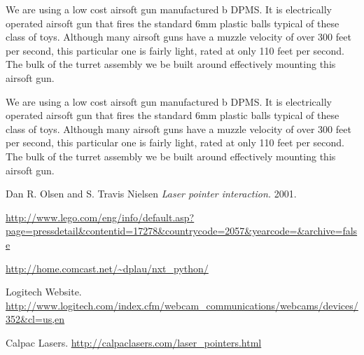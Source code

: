 \documentclass[10pt,twocolumn,letterpaper]{article}
\begin{document}
We are using a low cost airsoft gun manufactured b DPMS. It is electrically operated airsoft gun that fires the standard 6mm plastic balls typical of these class of toys. Although many airsoft guns have a muzzle velocity of over 300 feet per second, this particular one is fairly light, rated at only 110 feet per second. The bulk of the turret assembly we be built around effectively mounting this airsoft gun.

We are using a low cost airsoft gun manufactured b DPMS. It is electrically operated airsoft gun that fires the standard 6mm plastic balls typical of these class of toys. Although many airsoft guns have a muzzle velocity of over 300 feet per second, this particular one is fairly light, rated at only 110 feet per second. The bulk of the turret assembly we be built around effectively mounting this airsoft gun.



\begin{thebibliography}{1}

   Dan R. Olsen and S. Travis Nielsen {\em Laser pointer interaction.} 2001. 

   \url{http://www.lego.com/eng/info/default.asp?page=pressdetail&contentid=17278&countrycode=2057&yearcode=&archive=false}

   \url{http://home.comcast.net/~dplau/nxt\_python/}
  
	 Logitech Website. \url{http://www.logitech.com/index.cfm/webcam\_communications/webcams/devices/352&cl=us,en}

   Calpac Lasers. \url{http://calpaclasers.com/laser\_pointers.html}


  \end{thebibliography}
\end{document}
